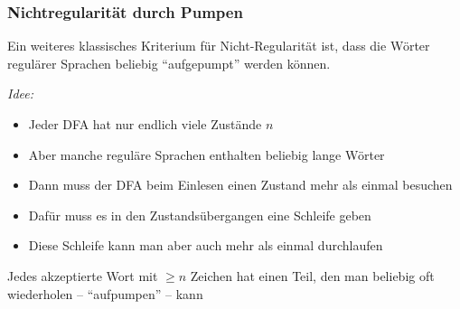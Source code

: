 \documentclass[aspectratio=1610,onlymath]{beamer}
\begin{document}
% 
% 

\newcommand{\colstackrel}[3]{\,{\stackrel{\textcolor{#3}{#1}}{\textcolor{#3}{#2}}}\,}
\newcommand{\gstackrel}[2]{\colstackrel{#1}{#2}{darkgreen}}
\newcommand{\bstackrel}[2]{\colstackrel{#1}{#2}{darkblue}}
\newcommand{\rstackrel}[2]{\colstackrel{#1}{#2}{darkred}}

\begin{frame}\frametitle{Nichtregularität durch Pumpen}

Ein weiteres klassisches Kriterium für Nicht-Regularität ist, dass die Wörter regulärer Sprachen
beliebig "`aufgepumpt"' werden können.
\bigskip

\emph{Idee:}
\begin{itemize}
\item Jeder DFA hat nur endlich viele Zustände $n$
\item Aber manche reguläre Sprachen enthalten beliebig lange Wörter
\end{itemize}
\pause
% 
\begin{itemize}
\item Dann muss der DFA beim Einlesen einen Zustand mehr als einmal besuchen
\item Dafür muss es in den Zustandsübergangen eine Schleife geben
\item Diese Schleife kann man aber auch mehr als einmal durchlaufen
% 
\end{itemize}\pause

\begin{center}
\alert{Jedes akzeptierte Wort mit $\geq n$ Zeichen hat einen Teil, den man beliebig oft wiederholen -- "`aufpumpen"' -- kann}
\end{center}

\end{frame}
\end{document}
